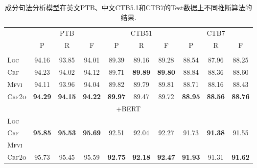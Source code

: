 \begin{table}[tb!]
  \centering
  \caption{成分句法分析模型在英文PTB、中文CTB5.1和CTB7的Test数据上不同推断算法的结果.}
  \begin{tabular}{lccccccccc}
    \toprule
                   & \multicolumn{3}{c}{PTB} & \multicolumn{3}{c}{CTB51} & \multicolumn{3}{c}{CTB7}                                                                                                       \\
                   & P                       & R                         & F                        & P              & R              & F              & P              & R              & F              \\[2pt]
    \midrule
    \\[-15pt]
    \textsc{Loc}   & 94.16                   & 93.85                     & 94.01                    & 89.39          & 89.16          & 89.28          & 88.54          & 87.96          & 88.25          \\
    \textsc{Crf}   & 94.23                   & 94.02                     & 94.12                    & 89.71          & \textbf{89.89} & \textbf{89.80} & 88.84          & 88.36          & 88.60          \\
    \textsc{Mfvi}  & 94.11                   & 93.96                     & 94.04                    & 89.82          & 89.79          & 89.81          & 88.71          & 88.16          & 88.43          \\
    \textsc{Crf2o} & \textbf{94.29}          & \textbf{94.15}            & \textbf{94.22}           & \textbf{89.97} & 89.47          & 89.72          & \textbf{88.95} & \textbf{88.56} & \textbf{88.76} \\
    \multicolumn{10}{c}{+BERT}                                                                                                                                                                            \\[3pt]
    \textsc{Loc}   &                         &                           &                          &                &                &                &                &                &                \\
    \textsc{Crf}   & \textbf{95.85}          & \textbf{95.53}            & \textbf{95.69}           & 92.51          & 92.04          & 92.27          & 91.73          & \textbf{91.38} & 91.55          \\
    \textsc{Mfvi}  &                         &                           &                          &                &                &                &                &                &                \\
    \textsc{Crf2o} & 95.73                   & 95.45                     & 95.59                    & \textbf{92.75} & \textbf{92.18} & \textbf{92.47} & \textbf{91.93} & 91.31          & \textbf{91.62} \\
    \bottomrule
  \end{tabular}
  \label{table:vi-con-test}
\end{table}


